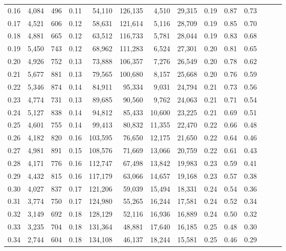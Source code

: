 \begin{tabular}{rrrrrrrrrrrrrr}
0.16 &  4,084 &  496 &  0.11 &   54,110 &  126,135 &   4,510 &  29,315 &  0.19 &  0.87 &      0.73 \\
0.17 &  4,521 &  606 &  0.12 &   58,631 &  121,614 &   5,116 &  28,709 &  0.19 &  0.85 &      0.70 \\
0.18 &  4,881 &  665 &  0.12 &   63,512 &  116,733 &   5,781 &  28,044 &  0.19 &  0.83 &      0.68 \\
0.19 &  5,450 &  743 &  0.12 &   68,962 &  111,283 &   6,524 &  27,301 &  0.20 &  0.81 &      0.65 \\
0.20 &  4,926 &  752 &  0.13 &   73,888 &  106,357 &   7,276 &  26,549 &  0.20 &  0.78 &      0.62 \\
0.21 &  5,677 &  881 &  0.13 &   79,565 &  100,680 &   8,157 &  25,668 &  0.20 &  0.76 &      0.59 \\
0.22 &  5,346 &  874 &  0.14 &   84,911 &   95,334 &   9,031 &  24,794 &  0.21 &  0.73 &      0.56 \\
0.23 &  4,774 &  731 &  0.13 &   89,685 &   90,560 &   9,762 &  24,063 &  0.21 &  0.71 &      0.54 \\
0.24 &  5,127 &  838 &  0.14 &   94,812 &   85,433 &  10,600 &  23,225 &  0.21 &  0.69 &      0.51 \\
0.25 &  4,601 &  755 &  0.14 &   99,413 &   80,832 &  11,355 &  22,470 &  0.22 &  0.66 &      0.48 \\
0.26 &  4,182 &  820 &  0.16 &  103,595 &   76,650 &  12,175 &  21,650 &  0.22 &  0.64 &      0.46 \\
0.27 &  4,981 &  891 &  0.15 &  108,576 &   71,669 &  13,066 &  20,759 &  0.22 &  0.61 &      0.43 \\
0.28 &  4,171 &  776 &  0.16 &  112,747 &   67,498 &  13,842 &  19,983 &  0.23 &  0.59 &      0.41 \\
0.29 &  4,432 &  815 &  0.16 &  117,179 &   63,066 &  14,657 &  19,168 &  0.23 &  0.57 &      0.38 \\
0.30 &  4,027 &  837 &  0.17 &  121,206 &   59,039 &  15,494 &  18,331 &  0.24 &  0.54 &      0.36 \\
0.31 &  3,774 &  750 &  0.17 &  124,980 &   55,265 &  16,244 &  17,581 &  0.24 &  0.52 &      0.34 \\
0.32 &  3,149 &  692 &  0.18 &  128,129 &   52,116 &  16,936 &  16,889 &  0.24 &  0.50 &      0.32 \\
0.33 &  3,235 &  704 &  0.18 &  131,364 &   48,881 &  17,640 &  16,185 &  0.25 &  0.48 &      0.30 \\
0.34 &  2,744 &  604 &  0.18 &  134,108 &   46,137 &  18,244 &  15,581 &  0.25 &  0.46 &      0.29 \\

\end{tabular}
